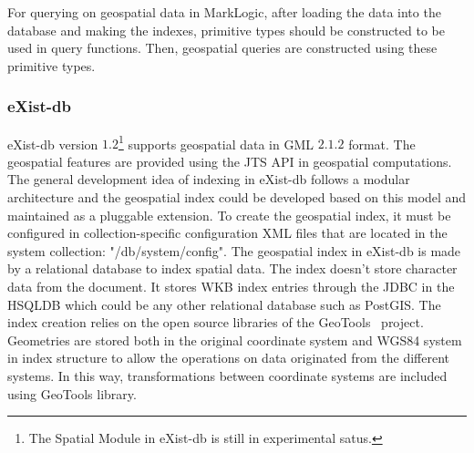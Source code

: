 \documentclass[a4paper,12pt]{article}
\begin{document}
For querying on geospatial data in MarkLogic, after loading the data into the database and making the indexes, primitive types should be constructed to be used in query functions. Then, geospatial queries are constructed using these primitive types. 

\subsubsection{eXist-db}

eXist-db version $1.2$\footnote{The Spatial Module in eXist-db is still in experimental satus.} supports geospatial data in GML $2.1.2$ format. The geospatial features are provided using the JTS API in geospatial computations. 
The general development idea of indexing in eXist-db follows a modular architecture and the geospatial index could be developed based on this model and maintained as a pluggable extension. To create the geospatial index, it must be configured in collection-specific configuration XML files that are located in the system collection: "/db/system/config". 
The geospatial index in eXist-db is made by a relational database to index spatial data. The index doesn't store character data from the document. It stores WKB index entries through the JDBC in  the HSQLDB which could be any other relational database such as PostGIS. The index creation relies on the open source libraries of the GeoTools~\cite{geotools} project. Geometries are stored both in the original coordinate system and WGS84 system in index structure to allow the operations on data originated from the different systems. In this way, transformations between coordinate systems are included using GeoTools library.
 
\end{document}

